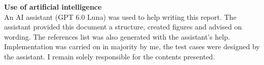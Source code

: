 \noindent\textbf{Use of artificial intelligence}\\[6pt]
An AI assistant (GPT 6.0 Luna) was used to help writing this report. The assistant provided this document a structure, created figures and advised on wording. The references list was also generated with the assistant's help. Implementation was carried on in majority by me, the test cases were designed by the assistant. I remain solely responsible for the contents presented.
